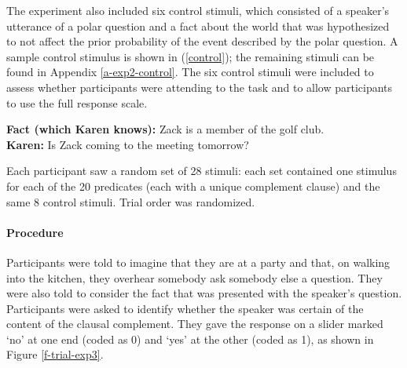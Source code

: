 \documentclass[11pt,fleqn]{article}
\newcommand{\6}{\mbox{$[\hspace*{-.6mm}[$}}
\newcommand{\9}{\mbox{$]\hspace*{-.6mm}]$}}
\begin{document}
The experiment also included six control stimuli, which consisted of a speaker's utterance of a polar question and a fact about the world that was hypothesized to not affect the prior probability of the event described by the polar question. A sample control stimulus is shown in (\ref{control}); the remaining stimuli can be found in Appendix \ref{a-exp2-control}. The six control stimuli were included to assess whether participants were attending to the task and to allow participants to use the full response scale. 

\begin{exe}
\ex\label{control}
{\bf Fact (which Karen knows):} Zack is a member of the golf club.
\\ {\bf Karen:} Is Zack coming to the meeting tomorrow?
\end{exe}


Each participant saw a random set of 28 stimuli: each set contained one stimulus for each of the 20 predicates (each with a unique complement clause) and the same 8 control stimuli. Trial order was randomized.




\paragraph{Procedure} Participants were told to imagine that they are at a party and that, on walking into the kitchen, they overhear somebody ask somebody else a question. They were also told to consider the fact that was presented with the speaker's question. Participants were asked to identify whether the speaker was certain of the content of the clausal complement. They gave the response on a slider marked `no' at one end (coded as 0) and `yes' at the other (coded as 1), as shown in Figure \ref{f-trial-exp3}.
\end{document}
